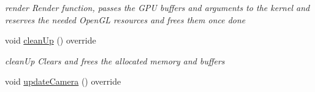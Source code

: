 \begin{DoxyCompactItemize}
\begin{DoxyCompactList}\small\item\em render Render function, passes the G\-P\-U buffers and arguments to the kernel and reserves the needed Open\-G\-L resources and frees them once done \end{DoxyCompactList}\item 
\hypertarget{classvRendererCL_a8b72cc2f7d637774e285105437af33d1}{void \hyperlink{classvRendererCL_a8b72cc2f7d637774e285105437af33d1}{clean\-Up} () override}\label{classvRendererCL_a8b72cc2f7d637774e285105437af33d1}

\begin{DoxyCompactList}\small\item\em clean\-Up Clears and frees the allocated memory and buffers \end{DoxyCompactList}\item 
\hypertarget{classvRendererCL_a9f8885e7a31fb62fdd32304ac422b56b}{void \hyperlink{classvRendererCL_a9f8885e7a31fb62fdd32304ac422b56b}{update\-Camera} () override}\label{classvRendererCL_a9f8885e7a31fb62fdd32304ac422b56b}


\end{DoxyCompactItemize}
